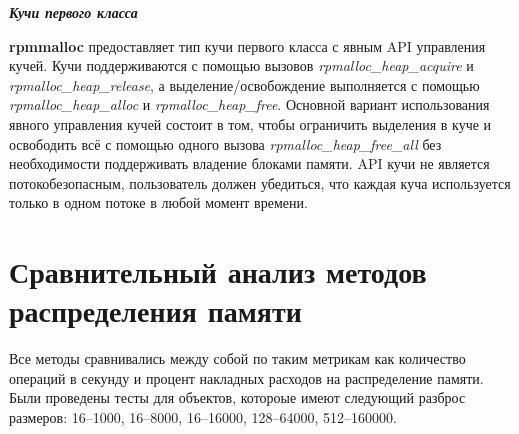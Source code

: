\bigbreak
\textit{\textbf{Кучи первого класса}}

\textbf{rpmmalloc} предоставляет тип кучи первого класса с явным API управления кучей. Кучи поддерживаются с помощью вызовов \textit{rpmalloc\_heap\_acquire} и \textit{rpmalloc\_heap\_release}, а выделение/освобождение выполняется с помощью \textit{rpmalloc\_heap\_alloc} и \textit{rpmalloc\_heap\_free}. Основной вариант использования явного управления кучей состоит в том, чтобы ограничить выделения в куче и освободить всё с помощью одного вызова \textit{rpmalloc\_heap\_free\_all} без необходимости поддерживать владение блоками памяти. API кучи не является потокобезопасным, пользователь должен убедиться, что каждая куча используется только в одном потоке в любой момент времени.

\section{Сравнительный анализ методов распределения памяти}
Все методы сравнивались между собой по таким метрикам как количество операций в секунду и процент накладных расходов на распределение памяти. Были проведены тесты для объектов, котороые имеют следующий разброс размеров: \numrange[range-phrase = --]{16}{1000}, \numrange[range-phrase = --]{16}{8000}, \numrange[range-phrase = --]{16}{16000}, \numrange[range-phrase = --]{128}{64000}, \numrange[range-phrase = --]{512}{160000}.
